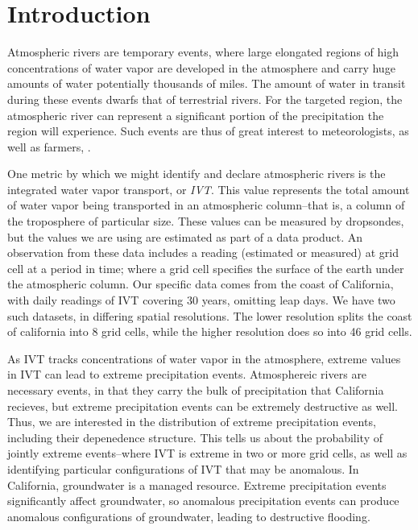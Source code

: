 
\section{Introduction}
Atmospheric rivers are temporary events, where large elongated regions of high concentrations of
  water vapor are developed in the atmosphere and carry huge amounts of water potentially thousands
  of miles.  The amount of water in transit during these events dwarfs that of terrestrial rivers.
  For the targeted region, the atmospheric river can represent a significant portion of the
  precipitation the region will experience.  Such events are thus of great interest to meteorologists,
  as well as farmers, .

One metric by which we might identify and declare atmospheric rivers is the integrated water vapor
  transport, or \emph{IVT}.  This value represents the total amount of water
  vapor being transported in an atmospheric column--that is, a column of the troposphere of particular
  size. These values can be measured by dropsondes, but the values we are using are estimated as part
  of a data product.  An observation from these data includes a reading (estimated
  or measured) at grid cell at a period in time; where a grid cell specifies the surface of the
  earth under the atmospheric column.  Our specific data comes from the coast of California,
  with daily readings of IVT covering 30 years, omitting leap days.  We have two such datasets, in
  differing spatial resolutions.  The lower resolution splits the coast of california into 8 grid
  cells, while the higher resolution does so into 46 grid cells.

As IVT tracks concentrations of water vapor in the atmosphere, extreme values in IVT can lead to
  extreme precipitation events.  Atmosphereic rivers are necessary events, in that they carry the
  bulk of precipitation that California recieves, but extreme precipitation events can be extremely
  destructive as well.  Thus, we are interested in the distribution of extreme precipitation events,
  including their depenedence structure.  This tells us about the probability of jointly extreme
  events--where IVT is extreme in two or more grid cells, as well as identifying particular
  configurations of IVT that may be anomalous.  In California, groundwater is a managed resource.
  Extreme precipitation events significantly affect groundwater, so anomalous precipitation events
  can produce anomalous configurations of groundwater, leading to destructive flooding.

